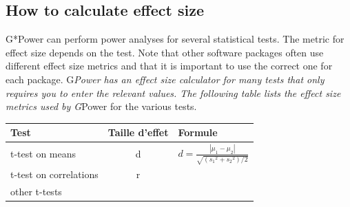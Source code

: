\documentclass[
  12pt,
]{book}
\begin{document}
\hypertarget{how-to-calculate-effect-size}{%
\subsection{How to calculate effect size}\label{how-to-calculate-effect-size}}

G*Power can perform power analyses for several statistical tests.
The metric for effect size depends on the test. Note that other
software packages often use different effect size metrics and that it is
important to use the correct one for each package. G\emph{Power has an
effect size calculator for many tests that only requires you to enter
the relevant values. The following table lists the effect size metrics
used by G}Power for the various tests.

\begin{longtable}[]{@{}lcl@{}}
\toprule
\begin{minipage}[b]{0.11\columnwidth}\raggedright
Test\strut
\end{minipage} & \begin{minipage}[b]{0.35\columnwidth}\centering
Taille d'effet\strut
\end{minipage} & \begin{minipage}[b]{0.46\columnwidth}\raggedright
Formule\strut
\end{minipage}\tabularnewline
\midrule
\endhead
\begin{minipage}[t]{0.11\columnwidth}\raggedright
t-test on means\strut
\end{minipage} & \begin{minipage}[t]{0.35\columnwidth}\centering
d\strut
\end{minipage} & \begin{minipage}[t]{0.46\columnwidth}\raggedright
\(d = \frac{|\mu_1 - \mu_2|}{\sqrt{({s_1}^2 + {s_2}^2)/2}}\)\strut
\end{minipage}\tabularnewline
\begin{minipage}[t]{0.11\columnwidth}\raggedright
t-test on correlations\strut
\end{minipage} & \begin{minipage}[t]{0.35\columnwidth}\centering
r\strut
\end{minipage} & \begin{minipage}[t]{0.46\columnwidth}\raggedright
\strut
\end{minipage}\tabularnewline
\begin{minipage}[t]{0.11\columnwidth}\raggedright
other t-tests\strut
\end{minipage} & \begin{minipage}[t]{0.35\columnwidth}\centering

\end{minipage}
\end{longtable}
\end{document}
